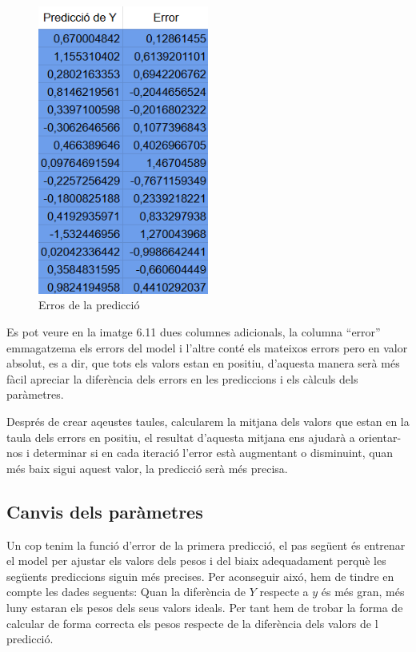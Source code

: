 \begin{figure}[H]
    \centering
    \includegraphics[width=0.5\textwidth]{./figures/Errors.png}
    \caption{Erros de la predicció}
\end{figure}

Es pot veure en la imatge 6.11 dues columnes adicionals, la columna ``error'' emmagatzema els errors del model i l'altre conté els mateixos errors pero en valor absolut, es a dir, que tots els valors estan en positiu, d'aquesta manera serà més fàcil apreciar la diferència dels errors en les prediccions i els càlculs dels paràmetres.

Després de crear aqeustes taules, calcularem la mitjana dels valors que estan en la taula dels errors en positiu, el resultat d'aquesta mitjana ens ajudarà a orientar-nos i determinar si en cada iteració l'error està augmentant o disminuint, quan més baix sigui aquest valor, la predicció serà més precisa.
\subsection{Canvis dels paràmetres}
Un cop tenim la funció d'error de la primera predicció, el pas següent és entrenar el model per ajustar els valors dels pesos i del biaix adequadament perquè les següents prediccions siguin més precises.
Per aconseguir aixó, hem de tindre en compte les dades seguents: Quan la diferència de $Y$ respecte a $y$ és més gran, més luny estaran els pesos dels seus valors ideals. Per tant hem de trobar la forma de calcular de forma correcta els pesos respecte de la diferència dels valors de l predicció.


